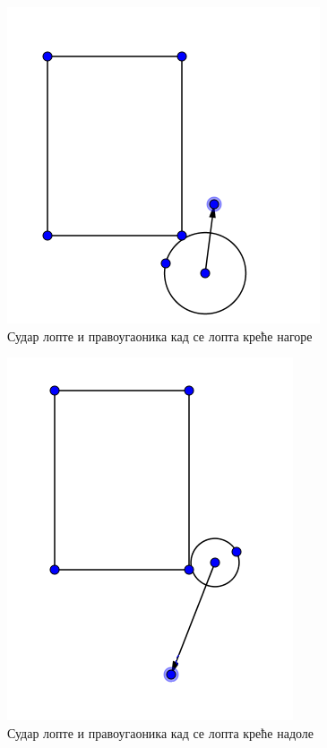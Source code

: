 \begin{figure}[htb!]
\begin{center}
\includegraphics[scale=.5]{pictures/physics/ballRectDown}
\caption{Судар лопте и правоугаоника кад се лопта креће нагоре}\label{fig:ballRectDown}
\end{center}
\end{figure}
\begin{figure}[htb!]
\begin{center}
\includegraphics[scale=.5]{pictures/physics/ballRectUp}
\caption{Судар лопте и правоугаоника кад се лопта креће надоле}\label{fig:ballRectUp}
\end{center}
\end{figure}

